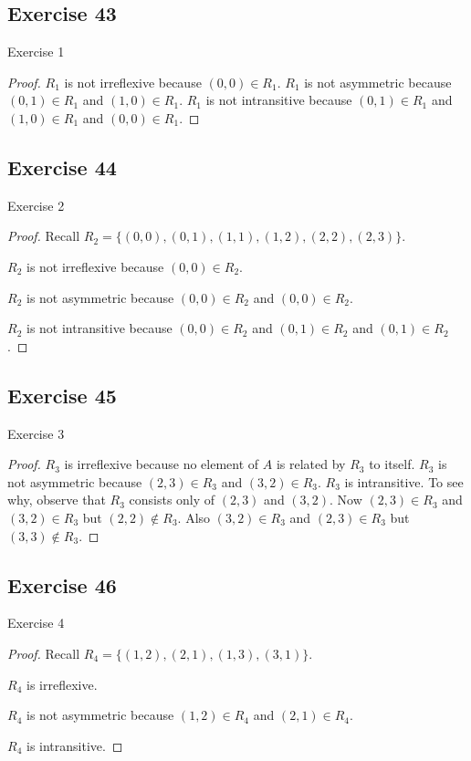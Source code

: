 \documentclass[14pt]{extarticle}
\begin{document}
\subsection{Exercise 43}
Exercise 1
\begin{proof}
\(R_1\) is not irreflexive because \((0, 0) \in R_1\). \(R_1\) is not asymmetric because \((0, 1) \in R_1\) and 
\((1, 0) \in R_1\). \(R_1\) is not intransitive because \((0, 1) \in R_1\) and \((1, 0) \in R_1\) and \((0, 0) \in R_1\).
\end{proof}

\subsection{Exercise 44}
Exercise 2
\begin{proof}
Recall \(R_2 = \{(0, 0), (0, 1), (1, 1), (1, 2), (2, 2), (2, 3)\}\).

\(R_2\) is not irreflexive because \((0, 0) \in R_2\).

\(R_2\) is not asymmetric because \((0, 0) \in R_2\) and \((0, 0) \in R_2\).

\(R_2\) is not intransitive because \((0, 0) \in R_2\) and \((0,1) \in R_2\) and \((0,1) \in R_2\).
\end{proof}

\subsection{Exercise 45}
Exercise 3
\begin{proof}
$R_3$ is irreflexive because no element of $A$ is related by $R_3$ to itself. $R_3$ is not asymmetric because 
\((2, 3) \in R_3\) and \((3, 2) \in R_3\). $R_3$ is intransitive. To see why, observe that $R_3$ consists only 
of \((2, 3)\) and \((3, 2)\). Now \((2, 3) \in R_3\) and \((3, 2) \in R_3\) but \((2, 2) \notin R_3\). Also 
\((3, 2) \in R_3\) and \((2, 3) \in R_3\) but \((3, 3) \notin R_3\).
\end{proof}

\subsection{Exercise 46}
Exercise 4
\begin{proof}
Recall \(R_4 = \{(1, 2), (2, 1), (1, 3), (3, 1)\}\).

\(R_4\) is irreflexive.

\(R_4\) is not asymmetric because \((1, 2) \in R_4\) and \((2, 1) \in R_4\).

\(R_4\) is intransitive.
\end{proof}
\end{document}
